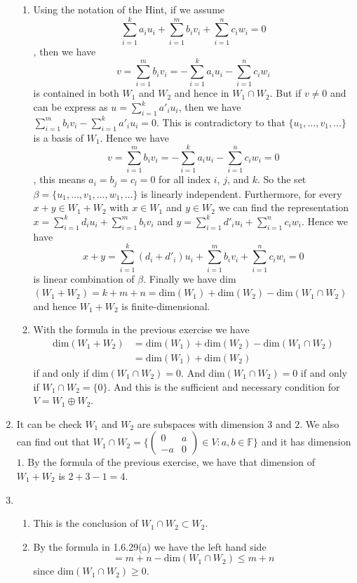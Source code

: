 \begin{enumerate}
\begin{enumerate}
\item Using the notation of the Hint, if we assume \[\sum_{i=1}^k{a_iu_i}+\sum_{i=1}^m{b_iv_i}+\sum_{i=1}^n{c_iw_i}=0\], then we have \[v=\sum_{i=1}^m{b_iv_i}=-\sum_{i=1}^k{a_iu_i}-\sum_{i=1}^n{c_iw_i}\] is contained in both $W_1$ and $W_2$ and hence in $W_1\cap W_2$. But if $v\neq 0$ and can be express as $u=\sum_{i=1}^k{a'_iu_i}$, then we have $\sum_{i=1}^m{b_iv_i}-\sum_{i=1}^k{a'_iu_i}=0$. This is contradictory to that $\{u_1,\ldots ,v_1,\ldots \}$ is a basis of $W_1$. Hence we have \[v=\sum_{i=1}^m{b_iv_i}=-\sum_{i=1}^k{a_iu_i}-\sum_{i=1}^n{c_iw_i}=0\], this means $a_i=b_j=c_l=0$ for all index $i$, $j$, and $k$. So the set $\beta =\{u_1,\ldots ,v_1,\ldots ,w_1, \ldots \}$ is linearly independent. Furthermore, for every $x+y\in W_1+W_2$ with $x\in W_1$ and $y\in W_2$ we can find the representation $x=\sum_{i=1}^k{d_iu_i}+\sum_{i=1}^m{b_iv_i}$ and $y=\sum_{i=1}^k{d'_iu_i}+\sum_{i=1}^n{c_iw_i}$. Hence we have \[x+y=\sum_{i=1}^k{(d_i+d'_i)u_i}+\sum_{i=1}^m{b_iv_i}+\sum_{i=1}^n{c_iw_i}=0\] is linear combination of $\beta $. Finally we have dim$(W_1+W_2)=k+m+n=$dim$(W_1)+$dim$(W_2)-$dim$(W_1\cap W_2)$ and hence $W_1+W_2$ is finite-dimensional.
\item With the formula in the previous exercise we have \begin{align*}\mathrm{dim}(W_1+W_2)&=\mathrm{dim}(W_1)+\mathrm{dim}(W_2)-\mathrm{dim}(W_1\cap W_2)\\&=\mathrm{dim}(W_1)+\mathrm{dim}(W_2)\end{align*} if and only if dim$(W_1\cap W_2)=0$. And dim$(W_1\cap W_2)=0$ if and only if $W_1\cap W_2=\{0\}$. And this is the sufficient and necessary condition for $V=W_1\oplus W_2$.
\end{enumerate}
\item It can be check $W_1$ and $W_2$ are subspaces with dimension $3$ and $2$. We also can find out that $W_1\cap W_2=\{\left(\begin{array}{cc}0&a\\-a&0\end{array}\right) \in V:a,b\in \mathbb{F}\}$ and it has dimension $1$. By the formula of the previous exercise, we have that dimension of $W_1+W_2$ is $2+3-1=4$.
\item \begin{enumerate}
\item This is the conclusion of $W_1\cap W_2\subset W_2$.
\item By the formula in 1.6.29(a) we have the left hand side\[=m+n-\mathrm{dim}(W_1\cap W_2)\leq m+n\] since dim$(W_1\cap W_2)\geq 0$.

\end{enumerate}
\end{enumerate}
